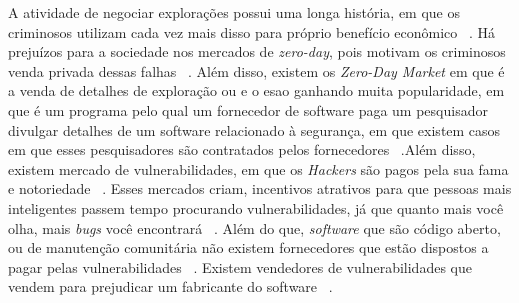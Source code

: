 \documentclass[brazil, utf8]{article}
\begin{document}
A atividade de negociar explorações possui uma longa história, em que os criminosos utilizam cada vez mais disso
para próprio benefício econômico ~\cite{Egelman:2013}. Há prejuízos para a sociedade nos mercados de \textit{zero-day},
pois motivam os criminosos venda privada dessas falhas ~\cite{Egelman:2013}. Além disso, existem os \textit{Zero-Day 
Market} em que é a venda de detalhes de exploração ou  e o  esao 
ganhando muita popularidade, em que  é um programa pelo qual um fornecedor de software paga um pesquisador divulgar 
detalhes de um software relacionado à segurança, em que existem casos em que esses pesquisadores são contratados pelos 
fornecedores ~\cite{Egelman:2013}.Além disso, existem mercado de vulnerabilidades, em que os \textit{Hackers} são pagos 
pela sua fama e notoriedade ~\cite{Egelman:2013}. Esses mercados criam, incentivos atrativos para que pessoas mais 
inteligentes passem tempo procurando vulnerabilidades, já que quanto mais você olha, mais \textit{bugs} você encontrará 
~\cite{Egelman:2013}. Além do que, \textit{software} que são código aberto, ou de manutenção comunitária não existem 
fornecedores que estão dispostos a pagar pelas vulnerabilidades ~\cite{Egelman:2013}. Existem vendedores de 
vulnerabilidades que vendem para prejudicar um fabricante do software ~\cite{Egelman:2013}.






\end{document}
